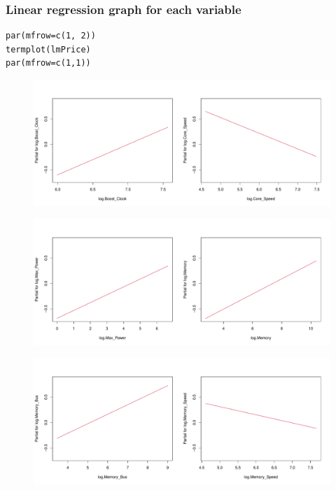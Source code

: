 \documentclass[a4paper]{article}
\begin{document}
\subsubsection{Linear regression graph for each variable}
\begin{mdframed}[leftline=false,rightline=false,backgroundcolor=lightblue!10,nobreak=false]
    \begin{verbatim}
par(mfrow=c(1, 2))
termplot(lmPrice)
par(mfrow=c(1,1))
    \end{verbatim}
\end{mdframed}
\begin{figure}[H]
    \centering
    \includegraphics[keepaspectratio, width=1\textwidth, height=1\textheight]{LRM/Rplot3.pdf}
\end{figure}
\begin{figure}[H]
    \centering
    \includegraphics[keepaspectratio, width=1\textwidth, height=1\textheight]{LRM/Rplot4.pdf}
\end{figure}
\begin{figure}[H]
    \centering
    \includegraphics[keepaspectratio, width=1\textwidth, height=1\textheight]{LRM/Rplot5.pdf}
\end{figure}
\end{document}
